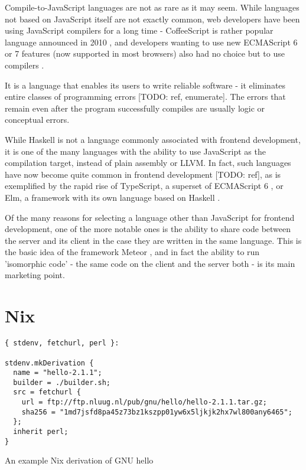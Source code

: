 \documentclass[english,odsaz]{fitthesis}
\begin{document}
Compile-to-JavaScript languages are not as rare as it may seem. While languages
not based on JavaScript itself are not exactly common, web developers have been
using JavaScript compilers for a long time - CoffeeScript is rather popular
language announced in 2010 \cite{coffeescript}, and developers wanting to use new
ECMAScript 6 or 7 features (now supported in most browsers) also had no choice
but to use compilers \cite{babel}.

It is a language that enables its users to write reliable software - it
eliminates entire classes of programming errors [TODO: ref, enumerate]. The
errors that remain even after the program successfully compiles are usually
logic or conceptual errors.

While Haskell is not a language commonly associated with frontend development,
it is one of the many languages with the ability to use JavaScript as the
compilation target, instead of plain assembly or LLVM. In fact, such languages
have now become quite common in frontend development [TODO: ref], as is
exemplified by the rapid rise of TypeScript, a superset of ECMAScript 6
\cite{typescript}, or Elm, a framework with its own language based on Haskell
\cite{czaplicki2012elm}.

Of the many reasons for selecting a language other than JavaScript for frontend
development, one of the more notable ones is the ability to share code between
the server and its client in the case they are written in the same
language. This is the basic idea of the framework Meteor \cite{meteor}, and in
fact the ability to run 'isomorphic code' - the same code on the client and the
server both - is its main marketing point.

\section{Nix}
\label{sec:orgf49c368}
\begin{listing}[htbp]
\begin{verbatim}
{ stdenv, fetchurl, perl }:

stdenv.mkDerivation {
  name = "hello-2.1.1";
  builder = ./builder.sh;
  src = fetchurl {
    url = ftp://ftp.nluug.nl/pub/gnu/hello/hello-2.1.1.tar.gz;
    sha256 = "1md7jsfd8pa45z73bz1kszpp01yw6x5ljkjk2hx7wl800any6465";
  };
  inherit perl;
}
\end{verbatim}
\caption{An example Nix derivation of GNU hello}
\end{listing}
\end{document}
